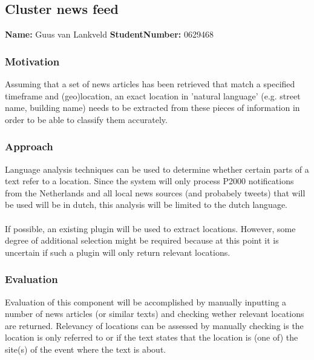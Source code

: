 \subsection{Cluster news feed}
\textbf{Name:}  Guus van Lankveld \indent \textbf{StudentNumber:} 0629468

\subsubsection*{Motivation}
Assuming that a set of news articles has been retrieved that match a specified timeframe and (geo)location, an exact location in 'natural language' (e.g. street name, building name) needs to be extracted from these pieces of information in order to be able to classify them accurately. 

\subsubsection*{Approach}
Language analysis techniques can be used to determine whether certain parts of a text refer to a location. Since the system will only process P2000 notifications from the Netherlands and all local news sources (and probabely tweets) that will be used will be in dutch, this analysis will be limited to the dutch language.\\\\
If possible, an existing plugin will be used to extract locations. However, some degree of additional selection might be required because at this point it is uncertain if such a plugin will only return relevant locations.

\subsubsection*{Evaluation }
Evaluation of this component will be accomplished by manually inputting a number of news articles (or similar texts) and checking wether relevant locations are returned. Relevancy of locations can be assessed by manually checking is the location is only referred to or if the text states that the location is (one of) the site(s) of the event where the text is about.